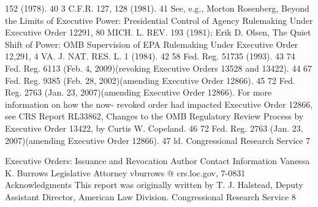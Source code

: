\documentclass[11pt,a4paper]{article}
\begin{document}
152 (1978). 40 3 C.F.R. 127, 128 (1981). 41 See, e.g., Morton Rosenberg, Beyond the Limits of Executive Power: Presidential Control of Agency Rulemaking Under Executive Order 12291, 80 MICH. L. REV. 193 (1981); Erik D. Olsen, The Quiet Shift of Power: OMB Supervision of EPA Rulemaking Under Executive Order 12,291, 4 VA. J. NAT. RES. L. 1 (1984). 42 58 Fed. Reg. 51735 (1993). 43 74 Fed. Reg. 6113 (Feb. 4, 2009)(revoking Executive Orders 13528 and 13422). 44 67 Fed. Reg. 9385 (Feb. 28, 2002)(amending Executive Order 12866). 45 72 Fed. Reg. 2763 (Jan. 23, 2007)(amending Executive Order 12866). For more information on how the now- revoked order had impacted Executive Order 12866, see CRS Report RL33862, Changes to the OMB Regulatory Review Process by Executive Order 13422, by Curtis W. Copeland. 46 72 Fed. Reg. 2763 (Jan. 23, 2007)(amending Executive Order 12866). 47 ld. Congressional Research Service 7

Executive Orders: Issuance and Revocation Author Contact Information Vanessa K. Burrows Legislative Attorney vburrows @ crs.loc.gov, 7-0831 Acknowledgments This report was originally written by T. J. Halstead, Deputy Assistant Director, American Law Division. Congressional Research Service 8
\end{document}
